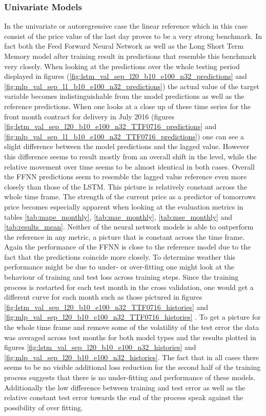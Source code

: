 \subsubsection{Univariate Models}
In the univariate or autoregressive case the linear reference which in this case consist of the price value of the last day proves to be a very strong benchmark. In fact both the Feed Forward Neural Network as well as the Long Short Term Memory model after training result in predictions that resemble this benchmark very closely. When looking at the predictions over the whole testing period displayed in figures (\ref{fig:lstm_val_sep_l20_b10_e100_n32_predictions} and \ref{fig:mlp_val_sep_l1_b10_e100_n32_predictions}) the actual value of the target variable becomes indistinguishable from the model predictions as well as the reference predictions. When one looks at a close up of these time series for the front month contract for delivery in July 2016 (figures \ref{fig:lstm_val_sep_l20_b10_e100_n32_TTF0716_predictions}
 and \ref{fig:mlp_val_sep_l1_b10_e100_n32_TTF0716_predictions})
one can see a slight difference between the model predictions and the lagged value. However this difference seems to result mostly from an overall shift in the level, while the relative movement over time seems to be almost identical in both cases. Overall the FFNN predictions seem to resemble the lagged value reference even more closely than those of the LSTM. This picture is relatively constant across the whole time frame. The strength of the current price as a predictor of tomorrows price becomes especially apparent when looking at the evaluation metrics in tables \ref{tab:mape_monthly}, \ref{tab:mae_monthly}, \ref{tab:mse_monthly} and \ref{tab:results_mean}. Neither of the neural network models is able to outperform the reference in any metric, a picture that is constant across the time frame. Again the performance of the FFNN  is close to the reference model due to the fact that the predictions coincide more closely. To determine weather this performance might be due to under- or over-fitting one might look at the behaviour of training and test loss across training steps. Since the training process is restarted for each test month in the cross validation, one would get a different curve for each month such as those pictured in figures \ref{fig:lstm_val_sep_l20_b10_e100_n32_TTF0716_histories} and \ref{fig:mlp_val_sep_l20_b10_e100_n32_TTF0716_histories}
. To get a picture for the whole time frame and remove some of the volatility of the test error the data was averaged across test months for both model types and the results plotted in figures \ref{fig:lstm_val_sep_l20_b10_e100_n32_histories} and \ref{fig:mlp_val_sep_l20_b10_e100_n32_histories}. The fact that in all cases there seems to be no visible additional loss reduction for the second half of the training process suggests that there is no under-fitting and performance of these models. Additionally the low difference between training and test error as well as the relative constant test error towards the end of the process speak against the possibility of over fitting. 


